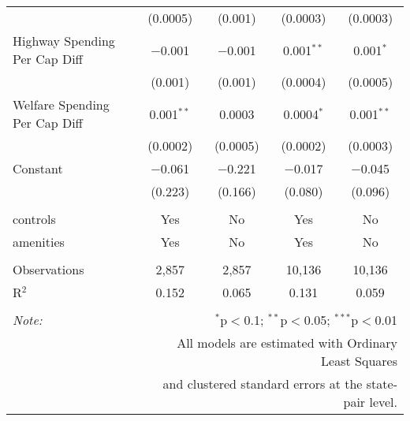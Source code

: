 \begin{table}[!htbp]
\begin{tabular}{@{\extracolsep{5pt}}lcccc}
  & (0.0005) & (0.001) & (0.0003) & (0.0003) \\ 
  Highway Spending Per Cap Diff & $-$0.001 & $-$0.001 & 0.001$^{**}$ & 0.001$^{*}$ \\ 
  & (0.001) & (0.001) & (0.0004) & (0.0005) \\ 
  Welfare Spending Per Cap Diff & 0.001$^{**}$ & 0.0003 & 0.0004$^{*}$ & 0.001$^{**}$ \\ 
  & (0.0002) & (0.0005) & (0.0002) & (0.0003) \\ 
  Constant & $-$0.061 & $-$0.221 & $-$0.017 & $-$0.045 \\ 
  & (0.223) & (0.166) & (0.080) & (0.096) \\ 
 \hline \\[-1.8ex] 
controls & Yes & No & Yes & No \\ 
amenities & Yes & No & Yes & No \\ 
\hline \\[-1.8ex] 
Observations & 2,857 & 2,857 & 10,136 & 10,136 \\ 
R$^{2}$ & 0.152 & 0.065 & 0.131 & 0.059 \\ 
\hline 
\hline \\[-1.8ex] 
\textit{Note:}  & \multicolumn{4}{r}{$^{*}$p$<$0.1; $^{**}$p$<$0.05; $^{***}$p$<$0.01} \\ 
 & \multicolumn{4}{r}{All models are estimated with Ordinary Least Squares} \\ 
 & \multicolumn{4}{r}{and clustered standard errors at the state-pair level.} \\ 
\end{tabular} 
\end{table} 
